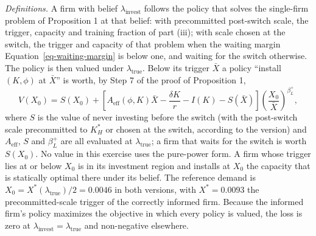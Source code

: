 \documentclass[
  11pt,
  letterpaper,
]{scrartcl}
\begin{document}
\emph{Definitions.} A firm with belief \(\lambda_{\text{invest}}\)
follows the policy that solves the single-firm problem of Proposition 1
at that belief: with precommitted post-switch scale, the trigger,
capacity and training fraction of part (iii); with scale chosen at the
switch, the trigger and capacity of that problem when the waiting margin
Equation~\ref{eq-waiting-margin} is below one, and waiting for the
switch otherwise. The policy is then valued under
\(\lambda_{\text{true}}\). Below its trigger \(\bar{X}\) a policy
``install \((K, \phi)\) at \(\bar{X}\)'' is worth, by Step 7 of the
proof of Proposition 1, \[
V(X_0) = S(X_0) + \left[A_{\text{eff}}(\phi, K)\bar{X} - \frac{\delta K}{r} - I(K) - S(\bar{X})\right]\left(\frac{X_0}{\bar{X}}\right)^{\beta_L^+},
\] where \(S\) is the value of never investing before the switch (with
the post-switch scale precommitted to \(K_H^*\) or chosen at the switch,
according to the version) and \(A_{\text{eff}}\), \(S\) and
\(\beta_L^+\) are all evaluated at \(\lambda_{\text{true}}\); a firm
that waits for the switch is worth \(S(X_0)\). No value in this exercise
uses the pure-power form. A firm whose trigger lies at or below \(X_0\)
is in its investment region and installs at \(X_0\) the capacity that is
statically optimal there under its belief. The reference demand is
\(X_0 = X^*(\lambda_{\text{true}})/2 = 0.0046\) in both versions, with
\(X^* = 0.0093\) the precommitted-scale trigger of the correctly
informed firm. Because the informed firm's policy maximizes the
objective in which every policy is valued, the loss is zero at
\(\lambda_{\text{invest}} = \lambda_{\text{true}}\) and non-negative
elsewhere.

\begingroup\setlength{\tabcolsep}{5pt}
\end{document}
